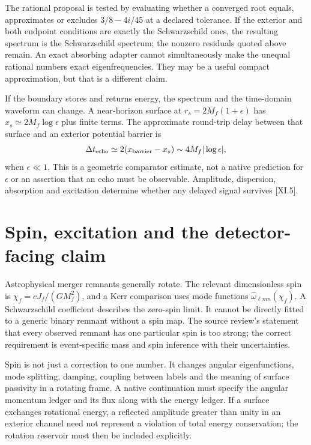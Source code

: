 The rational proposal is tested by evaluating whether a converged root equals, approximates or excludes $3/8-4i/45$ at a declared tolerance. If the exterior and both endpoint conditions are exactly the Schwarzschild ones, the resulting spectrum is the Schwarzschild spectrum; the nonzero residuals quoted above remain. An exact absorbing adapter cannot simultaneously make the unequal rational numbers exact eigenfrequencies. They may be a useful compact approximation, but that is a different claim.

If the boundary stores and returns energy, the spectrum and the time-domain waveform can change. A near-horizon surface at $r_s=2M_f(1+\epsilon)$ has $x_s\simeq2M_f\log\epsilon$ plus finite terms. The approximate round-trip delay between that surface and an exterior potential barrier is
\begin{equation}
 \Delta t_{\rm echo}\simeq2(x_{\rm barrier}-x_s)
             \sim4M_f|\log\epsilon|,
 \label{c11:echo}
\end{equation}
when $\epsilon\ll1$. This is a geometric comparator estimate, not a native prediction for $\epsilon$ or an assertion that an echo must be observable. Amplitude, dispersion, absorption and excitation determine whether any delayed signal survives [XI.5].

\section{Spin, excitation and the detector-facing claim}
Astrophysical merger remnants generally rotate. The relevant dimensionless spin is $\chi_f=cJ_f/(GM_f^2)$, and a Kerr comparison uses mode functions $\widehat\omega_{\ell mn}(\chi_f)$. A Schwarzschild coefficient describes the zero-spin limit. It cannot be directly fitted to a generic binary remnant without a spin map. The source review's statement that every observed remnant has one particular spin is too strong; the correct requirement is event-specific mass and spin inference with their uncertainties.

Spin is not just a correction to one number. It changes angular eigenfunctions, mode splitting, damping, coupling between labels and the meaning of surface passivity in a rotating frame. A native continuation must specify the angular momentum ledger and its flux along with the energy ledger. If a surface exchanges rotational energy, a reflected amplitude greater than unity in an exterior channel need not represent a violation of total energy conservation; the rotation reservoir must then be included explicitly.


